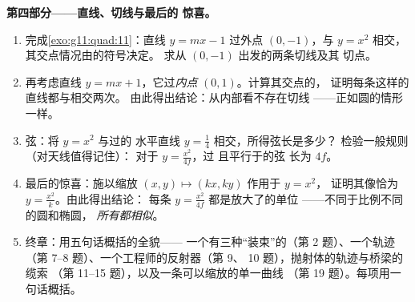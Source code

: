\begin{problem}
\medskip
\noindent\textbf{第四部分——直线、切线与最后的
惊喜。}
\begin{enumerate}[resume]
  \item 完成\cref{exo:g11:quad:11}：直线
        $y = mx - 1$ 过外点 $(0, -1)$，与
        $y = x^2$ 相交，其交点情况由的符号决定。
        求从 $(0, -1)$ 出发的两条切线及其
        切点。
  \item 再考虑直线 $y = mx + 1$，它过\emph{内点}
        $(0, 1)$。计算其交点的，
        证明每条这样的直线都与相交两次。
        由此得出结论：从内部看不存在切线
        ——正如圆的情形一样。
  \item {}弦：将 $y = x^2$ 与过的
        水平直线 $y = \frac14$ 相交，所得弦长是多少？
        检验一般规则（对天线值得记住）：
        对于 $y = \frac{x^2}{4f}$，过
        且平行于的弦
        长为 $4f$。
  \item 最后的惊喜：施以缩放
        $(x, y) \mapsto (kx, ky)$ 作用于 $y = x^2$，
        证明其像恰为 $y = \frac{x^2}{k}$。由此得出结论：
        每条 $y = \frac{x^2}{4f}$ 都是放大了的单位
        ——不同于比例不同的圆和椭圆，
        \emph{所有都相似}。
  \item 终章：用五句话概括的全貌——
        一个有三种“装束”的（第 2 题）、一个轨迹
        （第 7--8 题）、一个工程师的反射器（第 9、
        10 题），抛射体的轨迹与桥梁的缆索
        （第 11--15 题），以及一条可以缩放的单一曲线
        （第 19 题）。每项用一句话概括。
\end{enumerate}
\end{problem}
